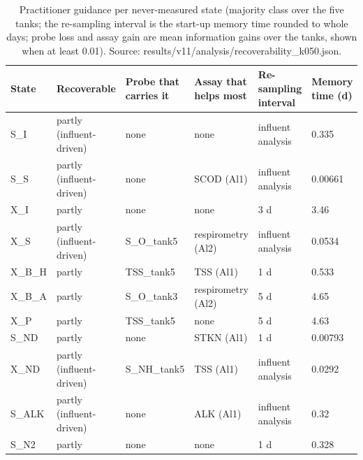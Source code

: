 \begin{table}[t]
\centering
\caption{Practitioner guidance per never-measured state (majority class over the five tanks; the re-sampling interval is the start-up memory time rounded to whole days; probe loss and assay gain are mean information gains over the tanks, shown when at least 0.01). Source: results/v11/analysis/recoverability\_k050.json.}
\label{tab:practitioner}
\footnotesize
\begin{tabular}{llllll}
\toprule
State & Recoverable & Probe that carries it & Assay that helps most & Re-sampling interval & Memory time (d) \\
\midrule
S\_I & partly (influent-driven) & none & none & influent analysis & 0.335 \\
S\_S & partly (influent-driven) & none & SCOD (Al1) & influent analysis & 0.00661 \\
X\_I & partly & none & none & 3 d & 3.46 \\
X\_S & partly (influent-driven) & S\_O\_tank5 & respirometry (Al2) & influent analysis & 0.0534 \\
X\_B\_H & partly & TSS\_tank5 & TSS (Al1) & 1 d & 0.533 \\
X\_B\_A & partly & S\_O\_tank3 & respirometry (Al2) & 5 d & 4.65 \\
X\_P & partly & TSS\_tank5 & none & 5 d & 4.63 \\
S\_ND & partly & none & STKN (Al1) & 1 d & 0.00793 \\
X\_ND & partly (influent-driven) & S\_NH\_tank5 & TSS (Al1) & influent analysis & 0.0292 \\
S\_ALK & partly (influent-driven) & none & ALK (Al1) & influent analysis & 0.32 \\
S\_N2 & partly & none & none & 1 d & 0.328 \\
\bottomrule
\end{tabular}
\end{table}
